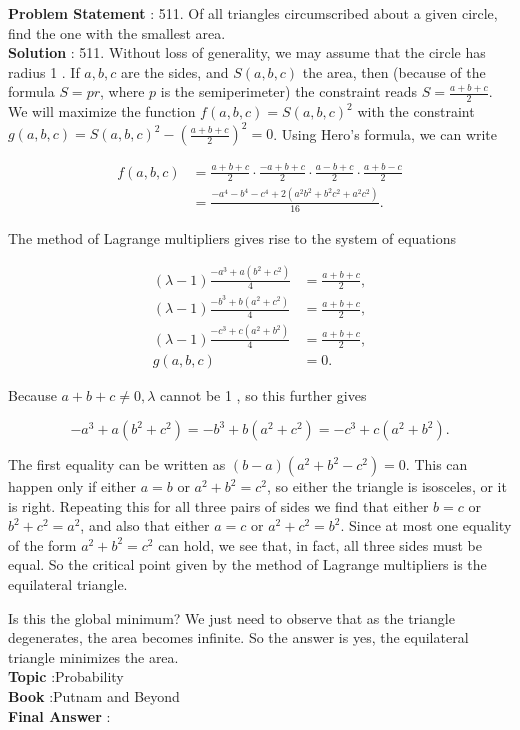 \documentclass[10pt]{article}
\begin{document}
\textbf{Problem Statement} :
511. Of all triangles circumscribed about a given circle, find the one with the smallest area.
\\
\textbf{Solution} :
511. Without loss of generality, we may assume that the circle has radius 1 . If $a, b, c$ are the sides, and $S(a, b, c)$ the area, then (because of the formula $S=p r$, where $p$ is the semiperimeter) the constraint reads $S=\frac{a+b+c}{2}$. We will maximize the function $f(a, b, c)=S(a, b, c)^{2}$ with the constraint $g(a, b, c)=S(a, b, c)^{2}-\left(\frac{a+b+c}{2}\right)^{2}=0$. Using Hero's formula, we can write

$$
\begin{aligned}
f(a, b, c) &=\frac{a+b+c}{2} \cdot \frac{-a+b+c}{2} \cdot \frac{a-b+c}{2} \cdot \frac{a+b-c}{2} \\
&=\frac{-a^{4}-b^{4}-c^{4}+2\left(a^{2} b^{2}+b^{2} c^{2}+a^{2} c^{2}\right)}{16} .
\end{aligned}
$$

The method of Lagrange multipliers gives rise to the system of equations

$$
\begin{aligned}
(\lambda-1) \frac{-a^{3}+a\left(b^{2}+c^{2}\right)}{4} &=\frac{a+b+c}{2}, \\
(\lambda-1) \frac{-b^{3}+b\left(a^{2}+c^{2}\right)}{4} &=\frac{a+b+c}{2}, \\
(\lambda-1) \frac{-c^{3}+c\left(a^{2}+b^{2}\right)}{4} &=\frac{a+b+c}{2}, \\
g(a, b, c) &=0 .
\end{aligned}
$$

Because $a+b+c \neq 0, \lambda$ cannot be 1 , so this further gives

$$
-a^{3}+a\left(b^{2}+c^{2}\right)=-b^{3}+b\left(a^{2}+c^{2}\right)=-c^{3}+c\left(a^{2}+b^{2}\right) .
$$

The first equality can be written as $(b-a)\left(a^{2}+b^{2}-c^{2}\right)=0$. This can happen only if either $a=b$ or $a^{2}+b^{2}=c^{2}$, so either the triangle is isosceles, or it is right. Repeating this for all three pairs of sides we find that either $b=c$ or $b^{2}+c^{2}=a^{2}$, and also that either $a=c$ or $a^{2}+c^{2}=b^{2}$. Since at most one equality of the form $a^{2}+b^{2}=c^{2}$ can hold, we see that, in fact, all three sides must be equal. So the critical point given by the method of Lagrange multipliers is the equilateral triangle.

Is this the global minimum? We just need to observe that as the triangle degenerates, the area becomes infinite. So the answer is yes, the equilateral triangle minimizes the area.
\\
\textbf{Topic} :Probability\\
\textbf{Book} :Putnam and Beyond\\
\textbf{Final Answer} :\\
\end{document}
